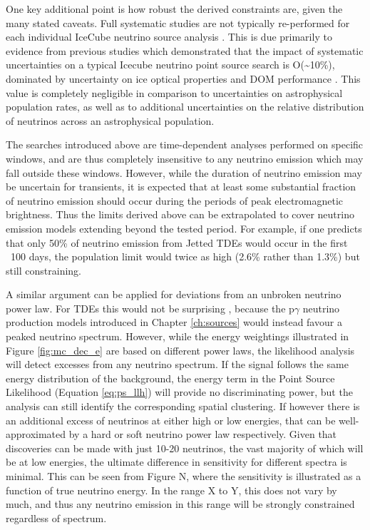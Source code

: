 One key additional point is how robust the derived constraints are, given the many stated caveats. Full systematic studies are not typically re-performed for each individual IceCube neutrino source analysis . This is due primarily to evidence from previous studies which demonstrated that the impact of systematic uncertainties on a typical Icecube neutrino point source search is O(\sim10\%), dominated by uncertainty on ice optical properties and DOM performance  . This value is completely negligible in comparison to uncertainties on astrophysical population rates, as well as to additional uncertainties on the relative distribution of neutrinos across an astrophysical population. 

The searches introduced above are time-dependent analyses performed on specific windows, and are thus completely insensitive to any neutrino emission which may fall outside these windows. However, while the duration of neutrino emission may be uncertain for transients, it is expected that at least some substantial fraction of neutrino emission should occur during the periods of peak electromagnetic brightness. Thus the limits derived above can be extrapolated to cover neutrino emission models extending beyond the tested period. For example, if one predicts that only 50\% of neutrino emission from Jetted TDEs would occur in the first ~100 days, the population limit would twice as high (2.6\% rather than 1.3\%) but still constraining.

A similar argument can be applied for deviations from an unbroken neutrino power law. For TDEs this would not be surprising , because the p$\gamma$ neutrino production models introduced in Chapter \ref{ch:sources} would instead favour a peaked neutrino spectrum. However, while the energy weightings illustrated in Figure \ref{fig:mc_dec_e} are based on different power laws, the likelihood analysis will detect excesses from any neutrino spectrum. If the signal follows the same energy distribution of the background, the energy term in the Point Source Likelihood (Equation \ref{eq:ps_llh}) will provide no discriminating power, but the analysis can still identify the corresponding spatial clustering. If however there is an additional excess of neutrinos at either high or low energies, that can be well-approximated by a hard or soft neutrino power law respectively. Given that discoveries can be made with just 10-20 neutrinos, the vast majority of which will be at low energies, the ultimate difference in sensitivity for different spectra is minimal. This can be seen from Figure N, where the sensitivity is illustrated as a function of true neutrino energy. In the range X to Y, this does not vary by much, and thus any neutrino emission in this range will be strongly constrained regardless of spectrum. 

